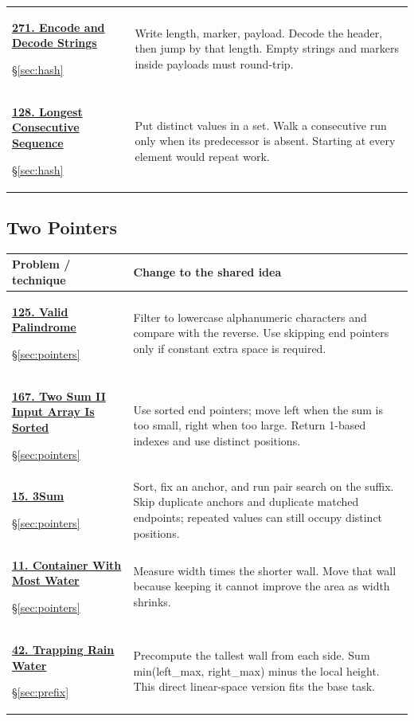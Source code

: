 \documentclass[11pt]{article}
\newcommand{\sect}[1]{\hyperref[sec:#1]{\S\ref*{sec:#1}}}
\begin{document}
\begin{longtable}{@{}L{4.3cm}L{11.7cm}@{}}
\hypertarget{lc271}{}\href{https://leetcode.com/problems/encode-and-decode-strings/}{\textbf{271. Encode and Decode Strings}}\par\sect{hash} & Write length, marker, payload. Decode the header, then jump by that length. Empty strings and markers inside payloads must round-trip.\\[4pt]
\hypertarget{lc128}{}\href{https://leetcode.com/problems/longest-consecutive-sequence/}{\textbf{128. Longest Consecutive Sequence}}\par\sect{hash} & Put distinct values in a set. Walk a consecutive run only when its predecessor is absent. Starting at every element would repeat work.\\[4pt]
\bottomrule
\end{longtable}
\subsection{Two Pointers}
\begin{longtable}{@{}L{4.3cm}L{11.7cm}@{}}
\toprule Problem / technique & Change to the shared idea \\ \midrule\endhead
\hypertarget{lc125}{}\href{https://leetcode.com/problems/valid-palindrome/}{\textbf{125. Valid Palindrome}}\par\sect{pointers} & Filter to lowercase alphanumeric characters and compare with the reverse. Use skipping end pointers only if constant extra space is required.\\[4pt]
\hypertarget{lc167}{}\href{https://leetcode.com/problems/two-sum-ii-input-array-is-sorted/}{\textbf{167. Two Sum II Input Array Is Sorted}}\par\sect{pointers} & Use sorted end pointers; move left when the sum is too small, right when too large. Return 1-based indexes and use distinct positions.\\[4pt]
\hypertarget{lc15}{}\href{https://leetcode.com/problems/3sum/}{\textbf{15. 3Sum}}\par\sect{pointers} & Sort, fix an anchor, and run pair search on the suffix. Skip duplicate anchors and duplicate matched endpoints; repeated values can still occupy distinct positions.\\[4pt]
\hypertarget{lc11}{}\href{https://leetcode.com/problems/container-with-most-water/}{\textbf{11. Container With Most Water}}\par\sect{pointers} & Measure width times the shorter wall. Move that wall because keeping it cannot improve the area as width shrinks.\\[4pt]
\hypertarget{lc42}{}\href{https://leetcode.com/problems/trapping-rain-water/}{\textbf{42. Trapping Rain Water}}\par\sect{prefix} & Precompute the tallest wall from each side. Sum min(left\_max, right\_max) minus the local height. This direct linear-space version fits the base task.\\[4pt]
\bottomrule
\end{longtable}
\end{document}

